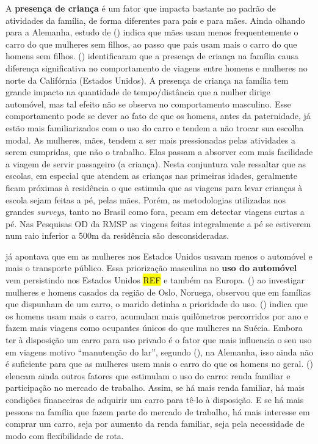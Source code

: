 A \textbf{presença de criança} é um fator que impacta bastante no padrão de atividades da família, de forma diferentes para pais e para mães. Ainda olhando para a Alemanha, estudo de  (\citeyear{BEST2005}) indica que mães usam menos frequentemente o carro do que mulheres sem filhos, ao passo que pais usam mais o carro do que homens sem filhos.
 (\citeyear{GODDARD2006}) identificaram que a presença de criança na família causa diferença significativa no comportamento de viagens entre homens e mulheres no norte da Califórnia (Estados Unidos). A presença de criança na família tem grande impacto na quantidade de tempo/distância que a mulher dirige automóvel, mas tal efeito não se observa no comportamento masculino. 
Esse comportamento pode se dever ao fato de que os homens, antes da paternidade, já estão mais familiarizados com o uso do carro e tendem a não trocar sua escolha modal. 
As mulheres, mães, tendem a ser mais pressionadas pelas atividades a serem cumpridas, que não o trabalho. Elas passam a absorver com mais facilidade a viagem de servir passageiro (a criança). Nesta conjuntura vale ressaltar que as escolas, em especial que atendem as crianças nas primeiras idades, geralmente ficam próximas à residência o que estimula que as viagens para levar crianças à escola sejam feitas a pé, pelas mães. Porém, as metodologias utilizadas nos grandes \emph{surveys}, tanto no Brasil como fora, pecam em detectar viagens curtas a pé. Nas Pesquisas OD da RMSP as viagens feitas integralmente a pé se estiverem num raio inferior a 500m da residência são desconsideradas.





 já apontava que em \citeyear{FOX1983} as mulheres nos Estados Unidos usavam menos o automóvel e mais o transporte público. Essa priorização masculina no \textbf{uso do automóvel} vem persistindo nos Estados Unidos \hl{REF} e também na Europa.  (\citeyear{HJORTHOL2000}) ao investigar mulheres e homens casados da região de Oslo, Noruega, observou que em famílias que dispunham de um carro, o marido detinha a prioridade do uso.  (\citeyear{POLK2003}) indica que os homens usam mais o carro, acumulam mais quilômetros percorridos por ano e fazem mais viagens como ocupantes únicos do que mulheres na Suécia.
Embora ter à disposição um carro para uso privado é o fator que mais influencia o seu uso em viagens motivo ``manutenção do lar'', segundo  (\citeyear{BEST2005}), na Alemanha, isso ainda não é suficiente para que as mulheres usem mais o carro do que os homens no geral. 
 (\citeyear{BEST2005}) elencam ainda outros fatores que estimulam o uso do carro: renda familiar e participação no mercado de trabalho. Assim, se há mais renda familiar, há mais condições financeiras de adquirir um carro para tê-lo à disposição. E se há mais pessoas na família que fazem parte do mercado de trabalho, há mais interesse em comprar um carro, seja por aumento da renda familiar, seja pela necessidade de modo com flexibilidade de rota.




